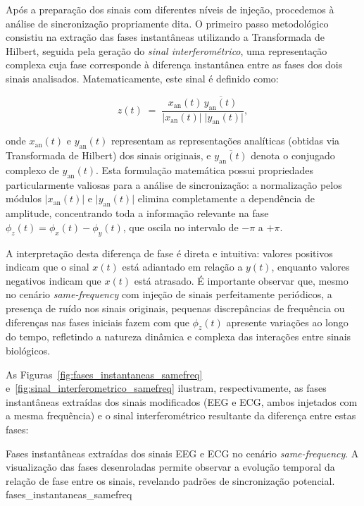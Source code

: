 Após a preparação dos sinais com diferentes níveis de injeção, procedemos à análise de sincronização propriamente dita. O primeiro passo metodológico consistiu na extração das fases instantâneas utilizando a Transformada de Hilbert, seguida pela geração do \textit{sinal interferométrico}, uma representação complexa cuja fase corresponde à diferença instantânea entre as fases dos dois sinais analisados. Matematicamente, este sinal é definido como:

\[
z(t) \;=\; \frac{x_{\mathrm{an}}(t)\,\overline{y_{\mathrm{an}}(t)}}{\bigl|x_{\mathrm{an}}(t)\bigr|\;\bigl|y_{\mathrm{an}}(t)\bigr|},
\]

onde \(x_{\mathrm{an}}(t)\) e \(y_{\mathrm{an}}(t)\) representam as representações analíticas (obtidas via Transformada de Hilbert) dos sinais originais, e \(\overline{y_{\mathrm{an}}(t)}\) denota o conjugado complexo de \(y_{\mathrm{an}}(t)\). Esta formulação matemática possui propriedades particularmente valiosas para a análise de sincronização: a normalização pelos módulos \(\bigl|x_{\mathrm{an}}(t)\bigr|\) e \(\bigl|y_{\mathrm{an}}(t)\bigr|\) elimina completamente a dependência de amplitude, concentrando toda a informação relevante na fase \(\phi_z(t) = \phi_x(t) - \phi_y(t)\), que oscila no intervalo de \(-\pi\) a \(+\pi\).

A interpretação desta diferença de fase é direta e intuitiva: valores positivos indicam que o sinal \(x(t)\) está adiantado em relação a \(y(t)\), enquanto valores negativos indicam que \(x(t)\) está atrasado. É importante observar que, mesmo no cenário \textit{same-frequency} com injeção de sinais perfeitamente periódicos, a presença de ruído nos sinais originais, pequenas discrepâncias de frequência ou diferenças nas fases iniciais fazem com que \(\phi_z(t)\) apresente variações ao longo do tempo, refletindo a natureza dinâmica e complexa das interações entre sinais biológicos.

As Figuras~\ref{fig:fases_instantaneas_samefreq} e~\ref{fig:sinal_interferometrico_samefreq} ilustram, respectivamente, as fases instantâneas extraídas dos sinais modificados (EEG e ECG, ambos injetados com a mesma frequência) e o sinal interferométrico resultante da diferença entre estas fases:

{Fases instantâneas extraídas dos sinais EEG e ECG no cenário \textit{same-frequency}. A visualização das fases desenroladas permite observar a evolução temporal da relação de fase entre os sinais, revelando padrões de sincronização potencial.}
{fases_instantaneas_samefreq}

